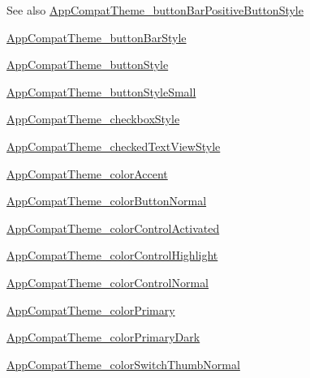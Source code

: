\begin{DoxySeeAlso}{See also}
\hyperlink{classandroid_1_1support_1_1design_1_1R_1_1styleable_ad6dccbdc26acca166bca4b6b693c30aa}{App\+Compat\+Theme\+\_\+button\+Bar\+Positive\+Button\+Style} 

\hyperlink{classandroid_1_1support_1_1design_1_1R_1_1styleable_a434b825974ffc445f7d2c1c0ebca20c2}{App\+Compat\+Theme\+\_\+button\+Bar\+Style} 

\hyperlink{classandroid_1_1support_1_1design_1_1R_1_1styleable_ae0dbe579dfa57a5cbc98e488b1a7d61b}{App\+Compat\+Theme\+\_\+button\+Style} 

\hyperlink{classandroid_1_1support_1_1design_1_1R_1_1styleable_ab5e406e1fb26b0441b85e2dc760d1898}{App\+Compat\+Theme\+\_\+button\+Style\+Small} 

\hyperlink{classandroid_1_1support_1_1design_1_1R_1_1styleable_a02bb9011b2cb08a21cec78bbaccf85f0}{App\+Compat\+Theme\+\_\+checkbox\+Style} 

\hyperlink{classandroid_1_1support_1_1design_1_1R_1_1styleable_a2c04271b29c4402ba6651dc55d3c3730}{App\+Compat\+Theme\+\_\+checked\+Text\+View\+Style} 

\hyperlink{classandroid_1_1support_1_1design_1_1R_1_1styleable_ade0801de138ef167ffaf75a110ce48b0}{App\+Compat\+Theme\+\_\+color\+Accent} 

\hyperlink{classandroid_1_1support_1_1design_1_1R_1_1styleable_ab55fa86e1ca1799c130f3c2f5b8ef8a1}{App\+Compat\+Theme\+\_\+color\+Button\+Normal} 

\hyperlink{classandroid_1_1support_1_1design_1_1R_1_1styleable_af7ed613c3f87592a89ab7e391abb7b7d}{App\+Compat\+Theme\+\_\+color\+Control\+Activated} 

\hyperlink{classandroid_1_1support_1_1design_1_1R_1_1styleable_a08a5b7e63a775cd41fec28def9a2e28f}{App\+Compat\+Theme\+\_\+color\+Control\+Highlight} 

\hyperlink{classandroid_1_1support_1_1design_1_1R_1_1styleable_acb676a1a9b146706ffe3ae4186403c10}{App\+Compat\+Theme\+\_\+color\+Control\+Normal} 

\hyperlink{classandroid_1_1support_1_1design_1_1R_1_1styleable_acffdce3af4b9cdfe390c502719236f7e}{App\+Compat\+Theme\+\_\+color\+Primary} 

\hyperlink{classandroid_1_1support_1_1design_1_1R_1_1styleable_a14ae278c8d0811cc9be02dcb6df531a3}{App\+Compat\+Theme\+\_\+color\+Primary\+Dark} 

\hyperlink{classandroid_1_1support_1_1design_1_1R_1_1styleable_a70a2af057154b1ea10f13cd045700a22}{App\+Compat\+Theme\+\_\+color\+Switch\+Thumb\+Normal} 


\end{DoxySeeAlso}
